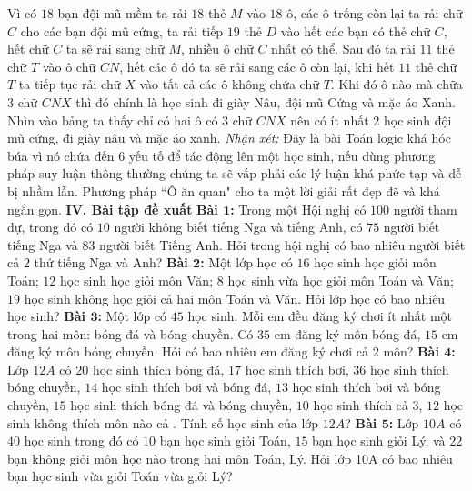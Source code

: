 \begin{multicols}{2}
\begin{figure}[H]
		\vspace*{-15pt}
	\end{figure}
	Vì có $18$ bạn đội mũ mềm ta rải $18$ thẻ $M$ vào $18$ ô, các ô trống còn lại ta rải chữ $C$ cho các bạn đội mũ cứng, ta rải tiếp $19$ thẻ $D$ vào hết các bạn có thẻ chữ $C$, hết chữ $C$ ta sẽ rải sang chữ $M$, nhiều ô chữ $C$ nhất có thể. Sau đó ta rải $11$ thẻ chữ $T$ vào ô chữ $CN$, hết các ô đó ta sẽ rải sang các ô còn lại, khi hết $11$ thẻ chữ $T$ ta tiếp tục rải chữ $X$ vào tất cả các ô không chứa chữ $T$. Khi đó ô nào mà chữa $3$ chữ $CNX$ thì đó chính là học sinh đi giày Nâu, đội mũ Cứng và mặc áo Xanh.
	\vskip 0.1cm
	Nhìn vào bảng ta thấy chỉ có hai ô có $3$ chữ $CNX$ nên có ít nhất $2$ học sinh đội mũ cứng, đi giày nâu và mặc áo xanh.
	\vskip 0.1cm
	\textit{Nhận xét:} Đây là bài Toán logic khá hóc búa vì nó chứa đến $6$ yếu tố để tác động lên một học sinh, nếu dùng phương pháp suy luận thông thường chúng ta sẽ vấp phải các lý luận khá phức tạp và dễ bị nhầm lẫn. Phương pháp ``Ô ăn quan" cho ta một lời giải rất đẹp đẽ và khá ngắn gọn.
	\vskip 0.1cm
	\textbf{\color{toancuabi}IV. Bài tập đề xuất}
	\vskip 0.1cm
	\textbf{\color{toancuabi}Bài $\pmb1$:} Trong một Hội nghị có $100$ người tham dự, trong đó có $10$ người không biết tiếng Nga và tiếng Anh, có $75$ người biết tiếng Nga và $83$ người biết Tiếng Anh. Hỏi trong hội nghị có bao nhiêu người biết cả $2$ thứ tiếng Nga và Anh?
	\vskip 0.1cm
	\textbf{\color{toancuabi}Bài $\pmb2$:} Một lớp học có $16$ học sinh học giỏi môn Toán; $12$ học sinh học giỏi môn Văn; $8$ học sinh vừa học giỏi môn Toán và Văn; $19$ học sinh không học giỏi cả hai môn Toán và Văn. Hỏi lớp học có bao nhiêu học sinh?
	\vskip 0.1cm
	\textbf{\color{toancuabi}Bài $\pmb3$:} Một lớp có $45$ học sinh. Mỗi em đều đăng ký chơi ít nhất một trong hai môn: bóng đá và bóng chuyền. Có $35$ em đăng ký môn bóng đá, $15$ em đăng ký môn bóng chuyền. Hỏi có bao nhiêu em đăng ký chơi cả $2$ môn?
	\vskip 0.1cm
	\textbf{\color{toancuabi}Bài $\pmb4$:} Lớp $12A$ có $20$ học sinh thích bóng đá, $17$ học sinh thích bơi, $36$ học sinh thích bóng chuyền, $14$ học sinh thích bơi và bóng đá, $13$ học sinh thích bơi và bóng chuyền, $15$ học sinh thích bóng đá và bóng chuyền, $10$ học sinh thích cả $3$, $12$ học sinh không thích môn nào cả . Tính số học sinh của lớp $12A$?
	\vskip 0.1cm
	\textbf{\color{toancuabi}Bài $\pmb5$:} Lớp $10A$ có $40$ học sinh trong đó có $10$ bạn học sinh giỏi Toán, $15$ bạn học sinh giỏi Lý, và $22$ bạn không giỏi môn học nào trong hai môn Toán, Lý. Hỏi lớp 10A có bao nhiêu bạn học sinh vừa giỏi Toán vừa giỏi Lý?
	\vskip 0.1cm

\end{multicols}
